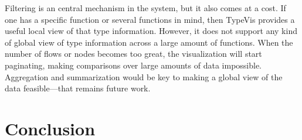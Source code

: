 \documentclass{vgtc}                          %
\begin{document}
Filtering is an central mechanism in the system,
but it also comes at a cost.
If one has a specific function or several functions
in mind, then {\sc TypeVis} provides a useful
local view of that type information.
However, it does not support any kind of global
view of type information across a large amount of
functions. When the number of flows or nodes
becomes too great, the visualization will start
paginating, making comparisons over large amounts
of data impossible.
Aggregation and summarization would be key to
making a global view of the data feasible---that
remains future work.


\section{Conclusion}


\end{document}
